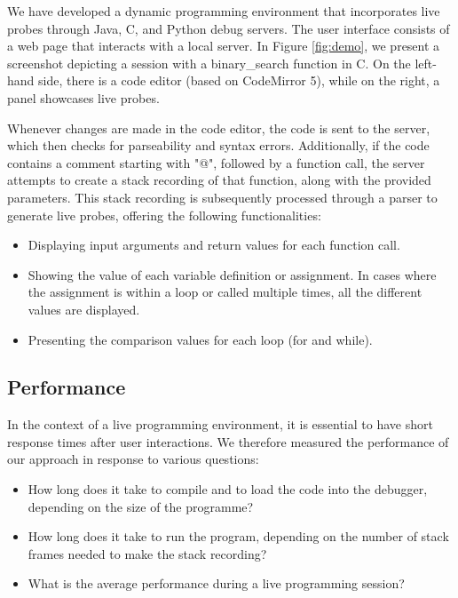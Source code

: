 \documentclass[english,submission]{programming}
\begin{document}
We have developed a dynamic programming environment that incorporates live probes through Java, C, and Python debug servers. 
The user interface consists of a web page that interacts with a local server. 
In Figure \ref{fig:demo}, we present a screenshot depicting a session with a binary\_search function in C. 
On the left-hand side, there is a code editor (based on CodeMirror 5), while on the right, a panel showcases live probes.

Whenever changes are made in the code editor, the code is sent to the server, which then checks for parseability and syntax errors. 
Additionally, if the code contains a comment starting with "@", followed by a function call, the server attempts to create a stack recording of that function, along with the provided parameters. 
This stack recording is subsequently processed through a parser to generate live probes, offering the following functionalities:

\begin{itemize}
  \item Displaying input arguments and return values for each function call.
  \item Showing the value of each variable definition or assignment. In cases where the assignment is within a loop or called multiple times, all the different values are displayed.
  \item Presenting the comparison values for each loop (for and while).
\end{itemize}
    
\subsection{Performance}
\label{sec:performance}

In the context of a live programming environment, it is essential to have short response times after user interactions. 
We therefore measured the performance of our approach in response to various questions:

\begin{itemize}
  \item How long does it take to compile and to load the code into the debugger, depending on the size of the programme?
  \item How long does it take to run the program, depending on the number of stack frames needed to make the stack recording?
  \item What is the average performance during a live programming session?
\end{itemize}
\end{document}
